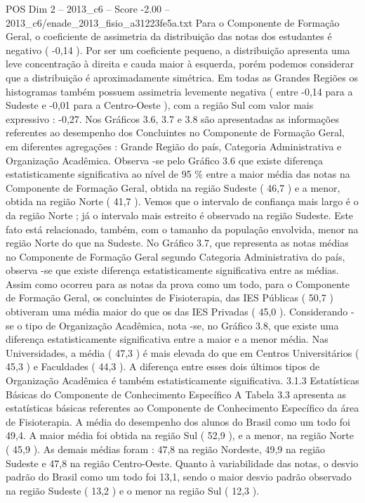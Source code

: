 \begin{textsample}{POS Dim 2 – 2013\_c6 – Score -2.00 – 2013\_c6/enade\_2013\_fisio\_a31223fe5a.txt}
Para o Componente de Formação Geral, o coeficiente de assimetria da distribuição das notas dos estudantes é negativo ( -0,14 ).
Por ser um coeficiente pequeno, a distribuição apresenta uma leve concentração à direita e cauda maior à esquerda, porém podemos considerar que a distribuição é aproximadamente simétrica.
Em todas as Grandes Regiões os histogramas também possuem assimetria levemente negativa ( entre -0,14 para a Sudeste e -0,01 para a Centro-Oeste ), com a região Sul com valor mais expressivo : -0,27.
Nos Gráficos 3.6, 3.7 e 3.8 são apresentadas as informações referentes ao desempenho dos Concluintes no Componente de Formação Geral, em diferentes agregações : Grande Região do país, Categoria Administrativa e Organização Acadêmica.
Observa -se pelo Gráfico 3.6 que existe diferença estatisticamente significativa ao nível de 95 \% entre a maior média das notas na Componente de Formação Geral, obtida na região Sudeste ( 46,7 ) e a menor, obtida na região Norte ( 41,7 ).
Vemos que o intervalo de confiança mais largo é o da região Norte ; já o intervalo mais estreito é observado na região Sudeste.
Este fato está relacionado, também, com o tamanho da população envolvida, menor na região Norte do que na Sudeste.
No Gráfico 3.7, que representa as notas médias no Componente de Formação Geral segundo Categoria Administrativa do país, observa -se que existe diferença estatisticamente significativa entre as médias.
Assim como ocorreu para as notas da prova como um todo, para o Componente de Formação Geral, os concluintes de Fisioterapia, das IES Públicas ( 50,7 ) obtiveram uma média maior do que os das IES Privadas ( 45,0 ).
Considerando -se o tipo de Organização Acadêmica, nota -se, no Gráfico 3.8, que existe uma diferença estatisticamente significativa entre a maior e a menor média.
Nas Universidades, a média ( 47,3 ) é mais elevada do que em Centros Universitários ( 45,3 ) e Faculdades ( 44,3 ).
A diferença entre esses dois últimos tipos de Organização Acadêmica é também estatisticamente significativa. 3.1.3 Estatísticas Básicas do Componente de Conhecimento Específico A Tabela 3.3 apresenta as estatísticas básicas referentes ao Componente de Conhecimento Específico da área de Fisioterapia.
A média do desempenho dos alunos do Brasil como um todo foi 49,4.
A maior média foi obtida na região Sul ( 52,9 ), e a menor, na região Norte ( 45,9 ).
As demais médias foram : 47,8 na região Nordeste, 49,9 na região Sudeste e 47,8 na região Centro-Oeste.
Quanto à variabilidade das notas, o desvio padrão do Brasil como um todo foi 13,1, sendo o maior desvio padrão observado na região Sudeste ( 13,2 ) e o menor na região Sul ( 12,3 ).

\end{textsample}
